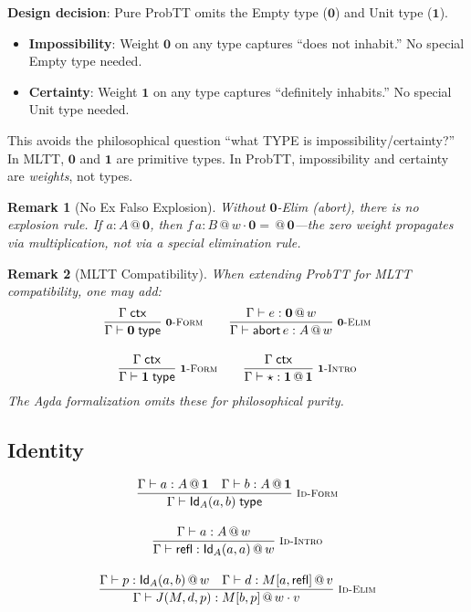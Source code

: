 \documentclass[11pt,a4paper]{article}
\makeatletter
\newcommand{\infer}[3][]{%
  \genfrac{}{}{0.4pt}{0}{#3}{#2}\;\textsc{\footnotesize #1}%
}
\newtheorem{remark}{Remark}[section]
\newcommand{\ctx}{\;\mathsf{ctx}}
\newcommand{\type}{\;\mathsf{type}}
\newcommand{\at}[1]{\,@\,#1}
\newcommand{\one}{\mathbf{1}}
\newcommand{\zero}{\mathbf{0}}
\makeatother
\begin{document}
\textbf{Design decision}: Pure ProbTT omits the Empty type ($\mathbf{0}$) and Unit type ($\mathbf{1}$).

\begin{itemize}
    \item \textbf{Impossibility}: Weight $\zero$ on any type captures ``does not inhabit.'' No special Empty type needed.
    \item \textbf{Certainty}: Weight $\one$ on any type captures ``definitely inhabits.'' No special Unit type needed.
\end{itemize}

This avoids the philosophical question ``what TYPE is impossibility/certainty?'' In MLTT, $\mathbf{0}$ and $\mathbf{1}$ are primitive types. In ProbTT, impossibility and certainty are \emph{weights}, not types.

\begin{remark}[No Ex Falso Explosion]
Without $\mathbf{0}$-Elim (abort), there is no explosion rule. If $a : A \at{\zero}$, then $f\,a : B \at{w \cdot \zero} = \at{\zero}$---the zero weight propagates via multiplication, not via a special elimination rule.
\end{remark}

\begin{remark}[MLTT Compatibility]
When extending ProbTT for MLTT compatibility, one may add:
\begin{gather*}
\infer[\textsc{$\mathbf{0}$-Form}]
  {\Gamma \vdash \mathbf{0} \type}
  {\Gamma \ctx}
\qquad
\infer[\textsc{$\mathbf{0}$-Elim}]
  {\Gamma \vdash \mathsf{abort}\,e : A \at{w}}
  {\Gamma \vdash e : \mathbf{0} \at{w}}
\\[1em]
\infer[\textsc{$\mathbf{1}$-Form}]
  {\Gamma \vdash \mathbf{1} \type}
  {\Gamma \ctx}
\qquad
\infer[\textsc{$\mathbf{1}$-Intro}]
  {\Gamma \vdash \star : \mathbf{1} \at{\one}}
  {\Gamma \ctx}
\end{gather*}
The Agda formalization omits these for philosophical purity.
\end{remark}

\subsection{Identity}

\begin{gather}
\infer[\textsc{Id-Form}]
  {\Gamma \vdash \mathsf{Id}_A(a, b) \type}
  {\Gamma \vdash a : A \at{\one} \quad \Gamma \vdash b : A \at{\one}}
\\[1em]
\infer[\textsc{Id-Intro}]
  {\Gamma \vdash \mathsf{refl} : \mathsf{Id}_A(a, a) \at{w}}
  {\Gamma \vdash a : A \at{w}}
\\[1em]
\infer[\textsc{Id-Elim}]
  {\Gamma \vdash J(M, d, p) : M[b, p] \at{w \cdot v}}
  {\Gamma \vdash p : \mathsf{Id}_A(a, b) \at{w} \quad \Gamma \vdash d : M[a, \mathsf{refl}] \at{v}}
\end{gather}
\end{document}

